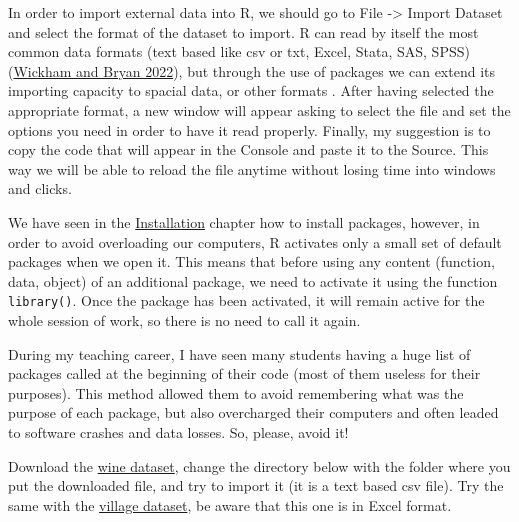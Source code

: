 \documentclass[
]{svmono}
\newenvironment{Shaded}{\begin{snugshade}}{\end{snugshade}}
\newcommand{\CommentTok}[1]{\textcolor[rgb]{0.56,0.35,0.01}{\textit{#1}}}
\newcommand{\FunctionTok}[1]{\textcolor[rgb]{0.13,0.29,0.53}{\textbf{#1}}}
\newcommand{\NormalTok}[1]{#1}
\newcommand{\OtherTok}[1]{\textcolor[rgb]{0.56,0.35,0.01}{#1}}
\newcommand{\SpecialCharTok}[1]{\textcolor[rgb]{0.81,0.36,0.00}{\textbf{#1}}}
\newcommand{\StringTok}[1]{\textcolor[rgb]{0.31,0.60,0.02}{#1}}
\begin{document}
In order to import external data into R, we should go to File -\textgreater{} Import
Dataset and select the format of the dataset to import. R can read by
itself the most common data formats (text based like csv or txt, Excel,
Stata, SAS, SPSS)(\protect\hyperlink{ref-wickham2022}{Wickham and Bryan 2022}), but through the use of packages we can
extend its importing capacity to spacial data, or other formats . After
having selected the appropriate format, a new window will appear asking
to select the file and set the options you need in order to have it read
properly. Finally, my suggestion is to copy the code that will appear in
the Console and paste it to the Source. This way we will be able to
reload the file anytime without losing time into windows and clicks.

We have seen in the \protect\hyperlink{installation}{Installation} chapter how to install packages,
however, in order to avoid overloading our computers, R activates only a
small set of default packages when we open it. This means that before
using any content (function, data, object) of an additional package, we
need to activate it using the function \texttt{library()}. Once the package has
been activated, it will remain active for the whole session of work, so
there is no need to call it again.

During my teaching career, I have seen many students having a huge list
of packages called at the beginning of their code (most of them useless
for their purposes). This method allowed them to avoid remembering what
was the purpose of each package, but also overcharged their computers
and often leaded to software crashes and data losses. So, please, avoid
it!

Download the \href{http://www.federicoroscioli.com/wp-content/uploads/2021/02/Wine.csv}{wine dataset}, change the directory below with the folder where you put the downloaded
file, and try to import it (it is a text based csv file). Try the same with the \href{http://www.federicoroscioli.com/wp-content/uploads/2022/03/Village.xlsx}{village dataset}, be aware that this one is in Excel format.

\begin{Shaded}
\end{Shaded}
\end{document}
